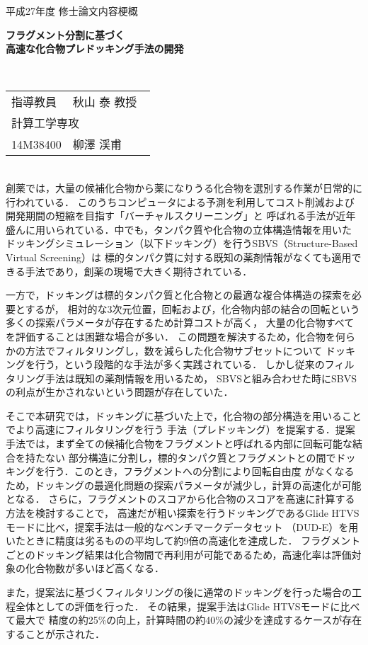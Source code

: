 {
 \thispagestyle{empty}
 \large
 \noindent
 平成27年度 修士論文内容梗概
　\\
 \begin{center}
  \textbf{\LARGE フラグメント分割に基づく\\高速な化合物プレドッキング手法の開発}
 \end{center}
　\\
 \hfill 
 \begin{tabular}{llll}
 指導教員& \multicolumn{3}{l}{秋山 泰 教授} \\
  \multicolumn{4}{l}{計算工学専攻} \\
 14M38400\hspace{.5cm} & {柳澤 渓甫}
 \end{tabular}

\mbox{}\\

創薬では，大量の候補化合物から薬になりうる化合物を選別する作業が日常的に行われている．
このうちコンピュータによる予測を利用してコスト削減および開発期間の短縮を目指す「バーチャルスクリーニング」と
呼ばれる手法が近年盛んに用いられている．中でも，タンパク質や化合物の立体構造情報を用いた
ドッキングシミュレーション（以下ドッキング）を行うSBVS（Structure-Based Virtual Screening）は
標的タンパク質に対する既知の薬剤情報がなくても適用できる手法であり，創薬の現場で大きく期待されている．

一方で，ドッキングは標的タンパク質と化合物との最適な複合体構造の探索を必要とするが，
相対的な3次元位置，回転および，化合物内部の結合の回転という多くの探索パラメータが存在するため計算コストが高く，
大量の化合物すべてを評価することは困難な場合が多い．
この問題を解決するため，化合物を何らかの方法でフィルタリングし，数を減らした化合物サブセットについて
ドッキングを行う，という段階的な手法が多く実践されている．
しかし従来のフィルタリング手法は既知の薬剤情報を用いるため，
SBVSと組み合わせた時にSBVSの利点が生かされないという問題が存在していた．

そこで本研究では，ドッキングに基づいた上で，化合物の部分構造を用いることでより高速にフィルタリングを行う
手法（プレドッキング）を提案する．提案手法では，まず全ての候補化合物をフラグメントと呼ばれる内部に回転可能な結合を持たない
部分構造に分割し，標的タンパク質とフラグメントとの間でドッキングを行う．このとき，フラグメントへの分割により回転自由度
がなくなるため，ドッキングの最適化問題の探索パラメータが減少し，計算の高速化が可能となる．
さらに，フラグメントのスコアから化合物のスコアを高速に計算する方法を検討することで，
高速だが粗い探索を行うドッキングであるGlide HTVSモードに比べ，提案手法は一般的なベンチマークデータセット
（DUD-E）を用いたときに精度は劣るものの平均して約9倍の高速化を達成した．
フラグメントごとのドッキング結果は化合物間で再利用が可能であるため，高速化率は評価対象の化合物数が多いほど高くなる．

また，提案法に基づくフィルタリングの後に通常のドッキングを行った場合の工程全体としての評価を行った．
その結果，提案手法はGlide HTVSモードに比べて最大で
精度の約25\%の向上，計算時間の約40\%の減少を達成するケースが存在することが示された．

\thispagestyle{empty}
\addtocounter{page}{-1}
}
